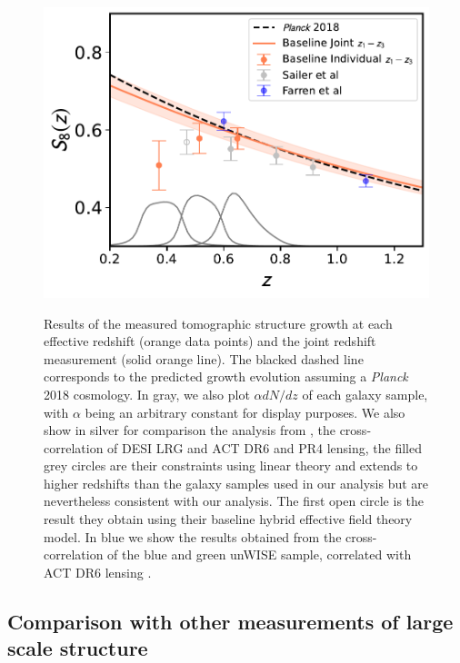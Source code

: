 \documentclass[twocolumn]{aastex631}
\begin{document}
{\begin{figure}
    \centering
    \includegraphics[width=\linewidth]{figures/dndist.pdf} \\ %
    \caption{Results of the measured tomographic structure growth at each effective redshift (orange data points) and the joint redshift measurement (solid orange line).
    The blacked dashed line corresponds to the predicted growth evolution assuming a \textit{Planck} 2018 cosmology. In gray, we also plot $\alpha{dN/dz}$ of each galaxy sample, with $\alpha$ being an arbitrary constant for display purposes. We also show in silver for comparison the analysis from \cite{Sailer2024,Kim2024}, the cross-correlation of DESI LRG and ACT DR6 and PR4 lensing, the filled grey circles are their constraints using linear theory and extends to higher redshifts than the galaxy samples used in our analysis but are nevertheless consistent with our analysis. The first open circle is the result they obtain using their baseline hybrid effective field theory model. In blue we show the results obtained from the cross-correlation of the blue and green unWISE sample, correlated with ACT DR6 lensing \citep{farren2023atacama}.}
    \label{Fig. redevol}
\end{figure}






\subsection{Comparison with other measurements of large scale structure}

}
\end{document}
